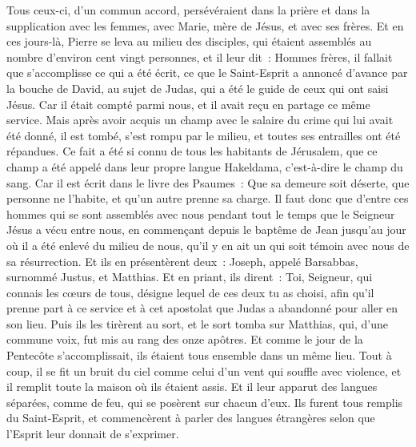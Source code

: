 \begin{multicols}{2}
Tous ceux-ci, d'un commun accord, persévéraient dans la prière et dans la supplication avec les femmes, avec Marie, mère de Jésus, et avec ses frères.
Et en ces jours-là, Pierre se leva au milieu des disciples, qui étaient assemblés au nombre d'environ cent vingt personnes, et il leur dit~:
Hommes frères, il fallait que s'accomplisse ce qui a été écrit, ce que le Saint-Esprit a annoncé d'avance par la bouche de David, au sujet de Judas, qui a été le guide de ceux qui ont saisi Jésus.
Car il était compté parmi nous, et il avait reçu en partage ce même service.
Mais après avoir acquis un champ avec le salaire du crime qui lui avait été donné, il est tombé, s'est rompu par le milieu, et toutes ses entrailles ont été répandues.
Ce fait a été si connu de tous les habitants de Jérusalem, que ce champ a été appelé dans leur propre langue Hakeldama, c'est-à-dire le champ du sang.
Car il est écrit dans le livre des Psaumes~: Que sa demeure soit déserte, que personne ne l'habite, et qu'un autre prenne sa charge.
Il faut donc que d'entre ces hommes qui se sont assemblés avec nous pendant tout le temps que le Seigneur Jésus a vécu entre nous,
en commençant depuis le baptême de Jean jusqu'au jour où il a été enlevé du milieu de nous, qu'il y en ait un qui soit témoin avec nous de sa résurrection.
Et ils en présentèrent deux~: Joseph, appelé Barsabbas, surnommé Justus, et Matthias.
Et en priant, ils dirent~: Toi, Seigneur, qui connais les cœurs de tous, désigne lequel de ces deux tu as choisi,
afin qu'il prenne part à ce service et à cet apostolat que Judas a abandonné pour aller en son lieu.
Puis ils les tirèrent au sort, et le sort tomba sur Matthias, qui, d'une commune voix, fut mis au rang des onze apôtres.
\VerseOne{}Et comme le jour de la Pentecôte s'accomplissait, ils étaient tous ensemble dans un même lieu.
Tout à coup, il se fit un bruit du ciel comme celui d'un vent qui souffle avec violence, et il remplit toute la maison où ils étaient assis.
Et il leur apparut des langues séparées, comme de feu, qui se posèrent sur chacun d'eux.
Ils furent tous remplis du Saint-Esprit, et commencèrent à parler des langues étrangères selon que l'Esprit leur donnait de s'exprimer.

\end{multicols}
